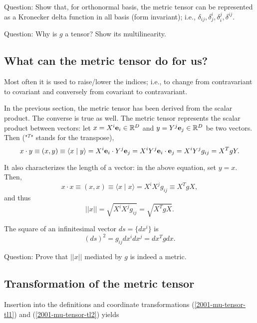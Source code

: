 Question: Show that, for orthonormal basis, the metric tensor can be
represented as a Kronecker delta function in all basis (form invariant);
i.e.,
$\delta_{ij},\delta^i_j,\delta_i^j,\delta^{ij}$.

Question: Why is $g$ a tensor? Show its multilinearity.

\subsection{What can the metric tensor do for us?}

Most often it is used to raise/lower the indices; i.e.,
to change from contravariant to covariant and conversely from covariant
to contravariant.

In the previous section, the metric tensor has been derived from the scalar product.
The converse is true as well.
The metric tensor represents the scalar product between vectors: let
$x=X^i{\bf e}_i \in {\Bbb R}^D$ and $y=Y^j{\bf e}_j \in {\Bbb R}^D$ be two vectors.
Then ("$^T$" stands for the transpose),
\begin{equation}
x\cdot y\equiv (x,y)\equiv \langle x\mid y\rangle
= X^i {\bf e}_i\cdot Y^j {\bf e}_j
= X^iY^j {\bf e}_i\cdot  {\bf e}_j
=X^iY^j g_{ij}= X^T g Y.
\end{equation}

It also characterizes the length of a vector: in the above
equation, set $y=x$. Then,
\begin{equation}
x\cdot x\equiv (x,x)\equiv \langle x\mid x\rangle
=X^iX^j g_{ij}\equiv X^T g X,
\end{equation}
and thus
\begin{equation}
\vert\vert  x\vert\vert  =\sqrt{X^iX^j g_{ij}}= \sqrt{X^T g X}.
\end{equation}


The square of an infinitesimal vector $ds =\{dx^i\}$ is
\begin{equation}
(d s)^2  = g_{ij}dx^idx^j= dx^T g dx.
\end{equation}


Question: Prove that $\vert\vert  x\vert\vert $ mediated by $g$ is
indeed a metric.

\subsection{Transformation of the metric tensor}

Insertion into the definitions and coordinate transformations
(\ref{2001-mu-tensor-tl1})
and
(\ref{2001-mu-tensor-tl2})
yields

